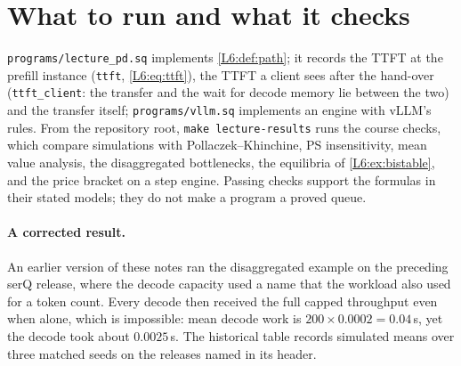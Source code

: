 \section{What to run and what it checks}

\texttt{programs/lecture\_pd.sq} implements \cref{L6:def:path}; it records the TTFT
at the prefill instance (\texttt{ttft}, \cref{L6:eq:ttft}), the TTFT a client sees
after the hand-over (\texttt{ttft\_client}: the transfer and the wait for decode memory
lie between the two) and the transfer itself;
\texttt{programs/vllm.sq} implements an engine with vLLM's rules. From the
repository root, \texttt{make lecture-results} runs the course checks, which compare
simulations with Pollaczek--Khinchine, PS insensitivity, mean value analysis, the
disaggregated bottlenecks, the equilibria of \cref{L6:ex:bistable}, and the price
bracket on a step engine. Passing checks support the formulas in their stated models;
they do not make a program a proved queue.

\paragraph{A corrected result.} An earlier version of these notes ran the
disaggregated example on the preceding serQ release, where the decode capacity used a
name that the workload also used for a token count. Every decode then received the
full capped throughput even when alone, which is impossible: mean decode work is
$200\times0.0002=0.04$\,s, yet the decode took about $0.0025$\,s. The historical table records
simulated means over three matched seeds on the releases named in its header.

